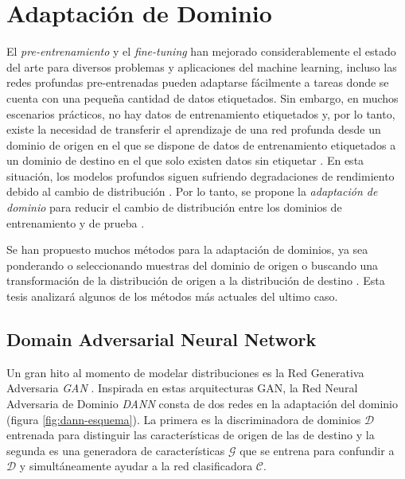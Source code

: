 \section{Adaptación de Dominio}
El {\it pre-entrenamiento} y el {\it fine-tuning} han mejorado considerablemente el estado del arte para diversos
problemas y aplicaciones del machine learning, incluso las redes profundas pre-entrenadas pueden adaptarse fácilmente a
tareas donde se cuenta con una pequeña cantidad de datos etiquetados. Sin embargo, en muchos escenarios prácticos, no
hay datos de entrenamiento etiquetados y, por lo tanto, existe la necesidad de transferir el aprendizaje de una red
profunda desde un dominio de origen en el que se dispone de datos de entrenamiento etiquetados a un dominio de destino
en el que solo existen datos sin etiquetar \parencite{glorot2011domain}. En esta situación, los modelos profundos siguen sufriendo degradaciones de rendimiento debido
al cambio de distribución \parencite{quinonero2008dataset}. Por lo tanto, se propone la {\it adaptación de dominio} para reducir el cambio de
distribución entre los dominios de entrenamiento y de prueba \parencite{jiang2022machine}.

Se han propuesto muchos métodos para la adaptación de dominios, ya sea ponderando o seleccionando muestras del dominio
de origen \parencite{sugiyama2007direct} o buscando una transformación de la distribución de origen a la distribución de destino \parencite{gong2013connecting}. Esta tesis analizará algunos de los métodos más actuales del ultimo caso.

\subsection{Domain Adversarial Neural Network}
Un gran hito al momento de modelar distribuciones es la Red Generativa Adversaria {\it GAN} \parencite{goodfellow2020generative}. Inspirada en estas arquitecturas GAN, la Red Neural Adversaria de Dominio {\it DANN} \parencite{ganin2016domain} consta de dos redes en la adaptación del dominio (figura \ref{fig:dann-esquema}). La primera es
la discriminadora de dominios $\mathcal{D}$ entrenada para distinguir las características de origen de las de destino y
la segunda es una generadora de características $\mathcal{G}$ que se entrena para confundir a $\mathcal{D}$ y
simultáneamente ayudar a la red clasificadora $\mathcal{C}$.

